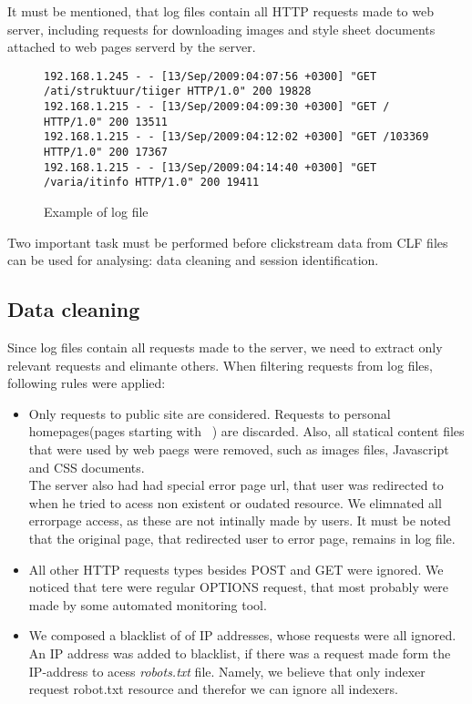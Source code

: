 \documentclass[english,a4paper]{article}
\begin{document}
It must be mentioned, that log files contain all HTTP requests made to web server, including requests for downloading images and style sheet documents attached to web pages serverd by the server.

\begin{figure}[h]
{\tiny
\begin{verbatim}
192.168.1.245 - - [13/Sep/2009:04:07:56 +0300] "GET /ati/struktuur/tiiger HTTP/1.0" 200 19828
192.168.1.215 - - [13/Sep/2009:04:09:30 +0300] "GET / HTTP/1.0" 200 13511
192.168.1.215 - - [13/Sep/2009:04:12:02 +0300] "GET /103369 HTTP/1.0" 200 17367
192.168.1.215 - - [13/Sep/2009:04:14:40 +0300] "GET /varia/itinfo HTTP/1.0" 200 19411
\end{verbatim}
}
\label{log_sample}
\caption{Example of log file}
\end{figure}

Two important task must be performed before clickstream data from CLF files can be used for analysing: data cleaning and session identification.

\subsection{Data cleaning}
Since log files contain all requests made to the server, we need to extract only relevant requests and elimante others. When filtering requests from log files, following rules were applied:

\begin{itemize}
  \item Only requests to public site are considered. Requests to personal homepages(pages starting with ~) are discarded. Also, all statical content files that were used by web paegs were removed, such as images files, Javascript and CSS documents. \\ The server also had had special error page url, that user was redirected to when he tried to acess non existent or oudated resource. We elimnated all errorpage access, as these are not intinally made by users. It must be noted that the original page, that redirected user to error page, remains in log file.
  
  \item All other HTTP requests types besides POST and GET were ignored. We noticed that tere were regular OPTIONS request, that most probably were made by some automated monitoring tool. 
  
  \item We composed a blacklist of of IP addresses, whose requests were all ignored. An IP address was added to blacklist, if there was a request made form the IP-address to acess \emph{robots.txt} file. Namely, we believe that only indexer request robot.txt resource and therefor we can ignore all indexers.
\end{itemize}
\end{document}
